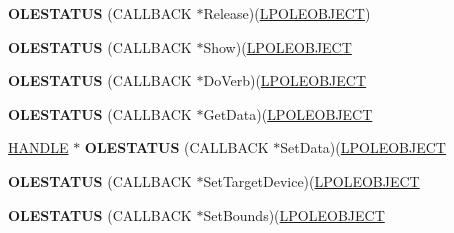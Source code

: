 \begin{DoxyCompactItemize}
\item 
\mbox{\label{struct___o_l_e_o_b_j_e_c_t_v_t_b_l_ab914b0fe99bfe1bc94ebc9eaeee022a6}} 
{\bfseries O\+L\+E\+S\+T\+A\+T\+US} (C\+A\+L\+L\+B\+A\+CK $\ast$Release)(\hyperlink{struct___o_l_e_o_b_j_e_c_t}{L\+P\+O\+L\+E\+O\+B\+J\+E\+CT})
\item 
\mbox{\label{struct___o_l_e_o_b_j_e_c_t_v_t_b_l_acd909ef8f3ceae440096479329af7caf}} 
{\bfseries O\+L\+E\+S\+T\+A\+T\+US} (C\+A\+L\+L\+B\+A\+CK $\ast$Show)(\hyperlink{struct___o_l_e_o_b_j_e_c_t}{L\+P\+O\+L\+E\+O\+B\+J\+E\+CT}
\item 
\mbox{\label{struct___o_l_e_o_b_j_e_c_t_v_t_b_l_a92634e3e9b8a8243d2dc458fd6141d79}} 
{\bfseries O\+L\+E\+S\+T\+A\+T\+US} (C\+A\+L\+L\+B\+A\+CK $\ast$Do\+Verb)(\hyperlink{struct___o_l_e_o_b_j_e_c_t}{L\+P\+O\+L\+E\+O\+B\+J\+E\+CT}
\item 
\mbox{\label{struct___o_l_e_o_b_j_e_c_t_v_t_b_l_a636feea2f85f66c0abda5d45710d1d2e}} 
{\bfseries O\+L\+E\+S\+T\+A\+T\+US} (C\+A\+L\+L\+B\+A\+CK $\ast$Get\+Data)(\hyperlink{struct___o_l_e_o_b_j_e_c_t}{L\+P\+O\+L\+E\+O\+B\+J\+E\+CT}
\item 
\mbox{\label{struct___o_l_e_o_b_j_e_c_t_v_t_b_l_a0004b2771726874c491568b9c2abd8df}} 
\hyperlink{interfacevoid}{H\+A\+N\+D\+LE} $\ast$ {\bfseries O\+L\+E\+S\+T\+A\+T\+US} (C\+A\+L\+L\+B\+A\+CK $\ast$Set\+Data)(\hyperlink{struct___o_l_e_o_b_j_e_c_t}{L\+P\+O\+L\+E\+O\+B\+J\+E\+CT}
\item 
\mbox{\label{struct___o_l_e_o_b_j_e_c_t_v_t_b_l_a7bbacf43b235da07e5f46512bc174805}} 
{\bfseries O\+L\+E\+S\+T\+A\+T\+US} (C\+A\+L\+L\+B\+A\+CK $\ast$Set\+Target\+Device)(\hyperlink{struct___o_l_e_o_b_j_e_c_t}{L\+P\+O\+L\+E\+O\+B\+J\+E\+CT}
\item 
\mbox{\label{struct___o_l_e_o_b_j_e_c_t_v_t_b_l_a0b16c306b8b437edfd7ad08500f03a5d}} 
{\bfseries O\+L\+E\+S\+T\+A\+T\+US} (C\+A\+L\+L\+B\+A\+CK $\ast$Set\+Bounds)(\hyperlink{struct___o_l_e_o_b_j_e_c_t}{L\+P\+O\+L\+E\+O\+B\+J\+E\+CT}
\item 

\end{DoxyCompactItemize}
